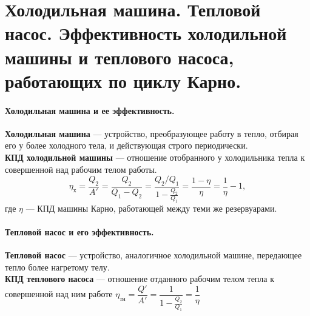 \section{\normalsize Холодильная машина. Тепловой насос. Эффективность холодильной машины и теплового насоса, работающих по циклу Карно.}
\paragraph{Холодильная машина и ее эффективность.} \textbf{Холодильная машина} --- устройство, преобразующее работу в тепло, отбирая его у более холодного тела, и действующая строго периодически.\\
\textbf{КПД холодильной машины} --- отношение отобранного у холодильника тепла к совершенной над рабочим телом работы. $$\eta_\text{х}=\dfrac{Q_2}{A'}=\dfrac{Q_2}{Q_1-Q_2}=\dfrac{Q_2/Q_1}{1-\frac{Q_2}{Q_1}}=\dfrac{1-\eta}{\eta}=\dfrac{1}{\eta}-1,$$ где $\eta$ --- КПД машины Карно, работающей между теми же резервуарами.
\paragraph{Тепловой насос и его эффективность.} \textbf{Тепловой насос} --- устройство, аналогичное холодильной машине, передающее тепло более нагретому телу.\\
\textbf{КПД теплового насоса} --- отношение отданного рабочим телом тепла к совершенной над ним работе $\eta_\text{тн}=\dfrac{Q'}{A'}=\dfrac{1}{1-\frac{Q_2}{Q_1}}=\dfrac{1}{\eta}$ 